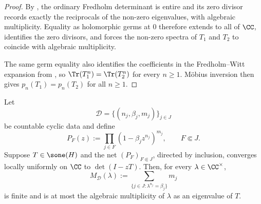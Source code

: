 \begin{proof}
  By
  , the
  ordinary Fredholm determinant is entire and its zero divisor records
  exactly the reciprocals of the non-zero eigenvalues, with algebraic
  multiplicity. Equality as holomorphic germs at \(0\) therefore extends
  to all of \(\CC\), identifies the zero divisors, and forces the non-zero
  spectra of \(T_1\) and \(T_2\) to coincide with algebraic multiplicity.

  The same germ equality also identifies the coefficients in the
  Fredholm--Witt expansion from , so
  \(\Tr(T_1^n)=\Tr(T_2^n)\) for every \(n\ge1\). M\"obius inversion then
  gives \(p_n(T_1)=p_n(T_2)\) for all \(n\ge1\).
\end{proof}

\begin{lemma}
  \label{lem:product-side-cyclic-divisor-multiplicity}
  Let
  \[
    \mathcal D=\{(n_j,\beta_j,m_j)\}_{j\in J}
  \]
  be countable cyclic data and define
  \[
    P_F(z):=\prod_{j\in F}(1-\beta_jz^{n_j})^{m_j},
    \qquad F\Subset J.
  \]
  Suppose \(T\in\sone(H)\) and the net \((P_F)_{F\Subset J}\), directed by
  inclusion, converges locally uniformly on \(\CC\) to
  \(\det(I-zT)\). Then, for every \(\lambda\in\CC^\times\),
  \[
    M_{\mathcal D}(\lambda)
    :=\sum_{\{j\in J:\lambda^{n_j}=\beta_j\}}m_j
  \]
  is finite and is at most the algebraic multiplicity of \(\lambda\) as an
  eigenvalue of \(T\).
\end{lemma}

